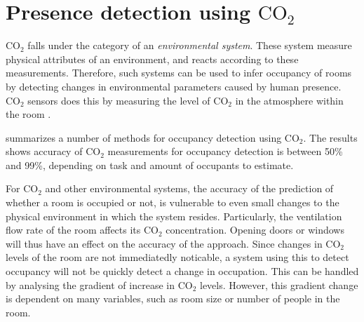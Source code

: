 \section{Presence detection using $\text{CO}_{2}$ }\label{sec:presence_env}
$\text{CO}_{2}$ falls under the category of an \textit{environmental system}. 
These system measure physical attributes of an environment, and reacts according to these measurements.
Therefore, such systems can be used to infer occupancy of rooms by detecting changes in environmental parameters caused by human presence.
$\text{CO}_{2}$ sensors does this by measuring the level of $\text{CO}_{2}$ in the atmosphere within the room \cite{longoAccurateOccupancyEstimation2019, gruberCO2SensorsOccupancy2014}.

\citeauthor{longoAccurateOccupancyEstimation2019}\cite{longoAccurateOccupancyEstimation2019} summarizes a number of methods for occupancy detection using $\text{CO}_{2}$. 
The results shows accuracy of $\text{CO}_{2}$ measurements for occupancy detection is between 50\% and 99\%, depending on task and amount of occupants to estimate.

For $\text{CO}_{2}$ and other environmental systems, the accuracy of the prediction of whether a room is occupied or not, is vulnerable to even small changes to the physical environment in which the system resides.\cite{gruberCO2SensorsOccupancy2014,longoAccurateOccupancyEstimation2019}
Particularly, the ventilation flow rate of the room affects its $\text{CO}_{2}$ concentration. Opening doors or windows will thus have an effect on the accuracy of the approach.
Since changes in $\text{CO}_{2}$ levels of the room are not immediatedly noticable, a system using this to detect occupancy will not be quickly detect a change in occupation.
This can be handled by analysing the gradient of increase in $\text{CO}_{2}$ levels\cite{gradient_co2}.
However, this gradient change is dependent on many variables, such as room size or number of people in the room. 
